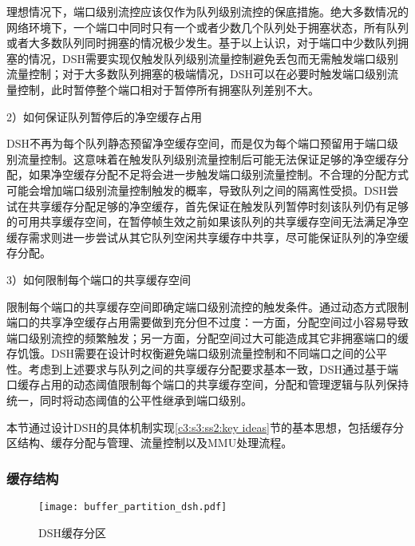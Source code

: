 理想情况下，端口级别流控应该仅作为队列级别流控的保底措施。绝大多数情况的网络环境下，一个端口中同时只有一个或者少数几个队列处于拥塞状态，所有队列或者大多数队列同时拥塞的情况极少发生。基于以上认识，对于端口中少数队列拥塞的情况，DSH需要实现仅触发队列级别流量控制避免丢包而无需触发端口级别流量控制；对于大多数队列拥塞的极端情况，DSH可以在必要时触发端口级别流量控制，此时暂停整个端口相对于暂停所有拥塞队列差别不大。

2）如何保证队列暂停后的净空缓存占用

DSH不再为每个队列静态预留净空缓存空间，而是仅为每个端口预留用于端口级别流量控制。这意味着在触发队列级别流量控制后可能无法保证足够的净空缓存分配，如果净空缓存分配不足将会进一步触发端口级别流量控制。不合理的分配方式可能会增加端口级别流量控制触发的概率，导致队列之间的隔离性受损。DSH尝试在共享缓存分配足够的净空缓存，首先保证在触发队列暂停时刻该队列仍有足够的可用共享缓存空间，在暂停帧生效之前如果该队列的共享缓存空间无法满足净空缓存需求则进一步尝试从其它队列空闲共享缓存中共享，尽可能保证队列的净空缓存分配。

3）如何限制每个端口的共享缓存空间

限制每个端口的共享缓存空间即确定端口级别流控的触发条件。通过动态方式限制端口的共享净空缓存占用需要做到充分但不过度：一方面，分配空间过小容易导致端口级别流控的频繁触发；另一方面，分配空间过大可能造成其它非拥塞端口的缓存饥饿。DSH需要在设计时权衡避免端口级别流量控制和不同端口之间的公平性。考虑到上述要求与队列之间的共享缓存分配要求基本一致，DSH通过基于端口缓存占用的动态阈值限制每个端口的共享缓存空间，分配和管理逻辑与队列保持统一，同时将动态阈值的公平性继承到端口级别。

\label{c3:s3:ss4:dsh mechanisms}

本节通过设计DSH的具体机制实现\ref{c3:s3:ss2:key ideas}节的基本思想，包括缓存分区结构、缓存分配与管理、流量控制以及MMU处理流程。

\subsubsection{缓存结构}

\begin{figure}[H]
  \centering
  \texttt{[image: buffer\_partition\_dsh.pdf]}
  \caption{DSH缓存分区}
  \label{c3:s3:ss4:fig:dsh buffer partition}
\end{figure}


